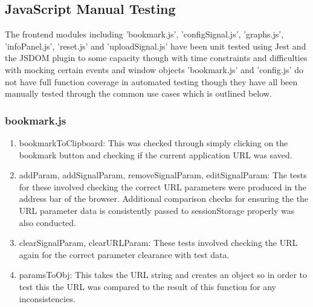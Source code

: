\subsection{JavaScript Manual Testing}
The frontend modules including 'bookmark.js', 'configSignal.js', 'graphs.js', 'infoPanel.js', 'reset.js' and 'uploadSignal.js' have been unit tested using Jest and the JSDOM plugin to some capacity though with time constraints and difficulties with mocking certain events and window objects 'bookmark.js' and 'config.js' do not have full function coverage in automated testing though they have all been manually tested through the common use cases which is outlined below.

\subsubsection{bookmark.js}
\begin{enumerate}
\item bookmarkToClipboard: This was checked through simply clicking on the bookmark button and checking if the current application URL was saved.
\item addParam, addSignalParam, removeSignalParam, editSignalParam: The tests for these involved checking the correct URL parameters were produced in the address bar of the browser. Additional comparison checks for ensuring the the URL parameter data is consistently passed to sessionStorage properly was also conducted. 
\item clearSignalParam, clearURLParam: These tests involved checking the URL again for the correct parameter clearance with test data.
\item paramsToObj: This takes the URL string and creates an object so in order to test this the URL was compared to the result of this function for any inconsistencies. 
\end{enumerate}

